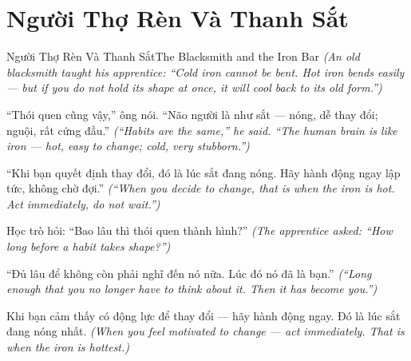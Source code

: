 \section{Người Thợ Rèn Và Thanh Sắt}
\begin{truyen}{Người Thợ Rèn Và Thanh Sắt}{The Blacksmith and the Iron Bar}
\textit{(An old blacksmith taught his apprentice: ``Cold iron cannot be bent. Hot iron bends easily — but if you do not hold its shape at once, it will cool back to its old form.'')}

``Thói quen cũng vậy,'' ông nói. ``Não người là như sắt — nóng, dễ thay đổi; nguội, rất cứng đầu.''
\textit{(``Habits are the same,'' he said. ``The human brain is like iron — hot, easy to change; cold, very stubborn.'')}

``Khi bạn quyết định thay đổi, đó là lúc sắt đang nóng. Hãy hành động ngay lập tức, không chờ đợi.''
\textit{(``When you decide to change, that is when the iron is hot. Act immediately, do not wait.'')}

Học trò hỏi: ``Bao lâu thì thói quen thành hình?''
\textit{(The apprentice asked: ``How long before a habit takes shape?'')}

``Đủ lâu để không còn phải nghĩ đến nó nữa. Lúc đó nó đã là bạn.''
\textit{(``Long enough that you no longer have to think about it. Then it has become you.'')}

\end{truyen}

\begin{baihoc}
Khi bạn cảm thấy có động lực để thay đổi — hãy hành động ngay. Đó là lúc sắt đang nóng nhất.
\textit{(When you feel motivated to change — act immediately. That is when the iron is hottest.)}
\end{baihoc}
\ngancach

